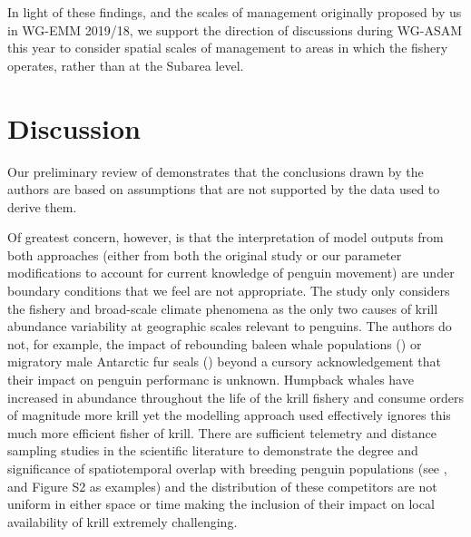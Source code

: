 \documentclass[]{elsarticle} %
\begin{document}
In light of these findings, and the scales of management originally
proposed by us in WG-EMM 2019/18, we support the direction of
discussions during WG-ASAM this year to consider spatial scales of
management to areas in which the fishery operates, rather than at the
Subarea level.

\section{Discussion}\label{discussion}

Our preliminary review of \citet{Watters2020} demonstrates that the
conclusions drawn by the authors are based on assumptions that are not
supported by the data used to derive them.

Of greatest concern, however, is that the interpretation of model
outputs from both approaches (either from both the original study or our
parameter modifications to account for current knowledge of penguin
movement) are under boundary conditions that we feel are not
appropriate. The study only considers the fishery and broad-scale
climate phenomena as the only two causes of krill abundance variability
at geographic scales relevant to penguins. The authors do not, for
example, the impact of rebounding baleen whale populations
(\citep{johannessen2022}) or migratory male Antarctic fur seals
(\citep{Lowther2020}) beyond a cursory acknowledgement that their impact
on penguin performanc is unknown. Humpback whales have increased in
abundance throughout the life of the krill fishery and consume orders of
magnitude more krill yet the modelling approach used effectively ignores
this much more efficient fisher of krill. There are sufficient telemetry
and distance sampling studies in the scientific literature to
demonstrate the degree and significance of spatiotemporal overlap with
breeding penguin populations (see \citet{Santora2013},
\citet{Lowther2020} and Figure S2 as examples) and the distribution of
these competitors are not uniform in either space or time making the
inclusion of their impact on local availability of krill extremely
challenging.
\end{document}
